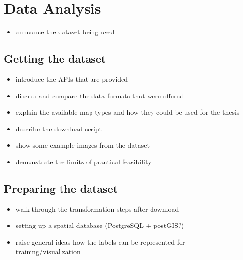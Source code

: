 \section{Data Analysis}
\begin{itemize}
    \item announce the dataset being used
\end{itemize}

\subsection{Getting the dataset}
\begin{itemize}
    \item introduce the APIs that are provided
    \item discuss and compare the data formats that were offered
    \item explain the available map types and how they could be used for the thesis
    \item describe the download script
    \item show some example images from the dataset
    \item demonstrate the limits of practical feasibility
\end{itemize}

\subsection{Preparing the dataset}
\begin{itemize}
    \item walk through the transformation steps after download
    \item setting up a spatial database (PostgreSQL + postGIS?)
    \item raise general ideas how the labels can be represented for training/visualization
\end{itemize}

\newpage
